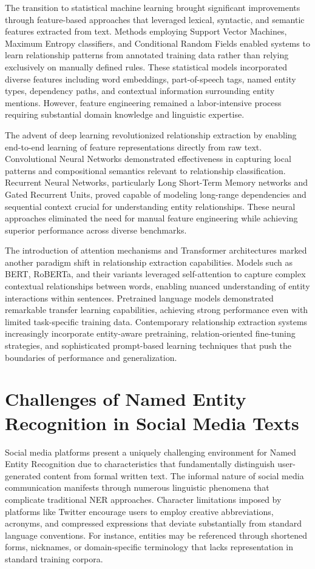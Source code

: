 \documentclass[12pt,a4paper]{report}
\begin{document}
The transition to statistical machine learning brought significant improvements through feature-based approaches that leveraged lexical, syntactic, and semantic features extracted from text. Methods employing Support Vector Machines, Maximum Entropy classifiers, and Conditional Random Fields enabled systems to learn relationship patterns from annotated training data rather than relying exclusively on manually defined rules. These statistical models incorporated diverse features including word embeddings, part-of-speech tags, named entity types, dependency paths, and contextual information surrounding entity mentions. However, feature engineering remained a labor-intensive process requiring substantial domain knowledge and linguistic expertise.

The advent of deep learning revolutionized relationship extraction by enabling end-to-end learning of feature representations directly from raw text. Convolutional Neural Networks demonstrated effectiveness in capturing local patterns and compositional semantics relevant to relationship classification. Recurrent Neural Networks, particularly Long Short-Term Memory networks and Gated Recurrent Units, proved capable of modeling long-range dependencies and sequential context crucial for understanding entity relationships. These neural approaches eliminated the need for manual feature engineering while achieving superior performance across diverse benchmarks.

The introduction of attention mechanisms and Transformer architectures marked another paradigm shift in relationship extraction capabilities. Models such as BERT, RoBERTa, and their variants leveraged self-attention to capture complex contextual relationships between words, enabling nuanced understanding of entity interactions within sentences. Pretrained language models demonstrated remarkable transfer learning capabilities, achieving strong performance even with limited task-specific training data. Contemporary relationship extraction systems increasingly incorporate entity-aware pretraining, relation-oriented fine-tuning strategies, and sophisticated prompt-based learning techniques that push the boundaries of performance and generalization.

\section{Challenges of Named Entity Recognition in Social Media Texts}

Social media platforms present a uniquely challenging environment for Named Entity Recognition due to characteristics that fundamentally distinguish user-generated content from formal written text. The informal nature of social media communication manifests through numerous linguistic phenomena that complicate traditional NER approaches. Character limitations imposed by platforms like Twitter encourage users to employ creative abbreviations, acronyms, and compressed expressions that deviate substantially from standard language conventions. For instance, entities may be referenced through shortened forms, nicknames, or domain-specific terminology that lacks representation in standard training corpora.
\end{document}
